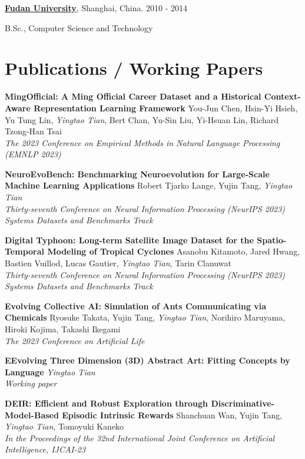 \documentclass[line,margin]{cv}
\newenvironment{block}
{
	\begin{addmargin}[2em]{0em}%
}
{
	\end{addmargin}
}
\newcommand{\Fudan}{\href{http://www.fudan.edu.cn/englishnew/}{Fudan University}}
\begin{document}
\begin{resume}
	{\bf \Fudan}, Shanghai, China. \hfill 2010 - 2014

	\begin{block}
		B.Sc., Computer Science and Technology 
	\end{block}



\section{Publications / Working Papers}

  {\bf MingOfficial: A Ming Official Career Dataset and a Historical Context-Aware Representation Learning Framework}
  You-Jun Chen, Hsin-Yi Hsieh, Yu Tung Lin, \emph{Yingtao Tian}, Bert Chan, Yu-Sin Liu, Yi-Hsuan Lin, Richard Tzong-Han Tsai\\
  \emph{The 2023 Conference on Empirical Methods in Natural Language Processing (EMNLP 2023)}

  {\bf NeuroEvoBench: Benchmarking Neuroevolution for Large-Scale Machine Learning Applications}
  Robert Tjarko Lange, Yujin Tang, \emph{Yingtao Tian}\\
  \emph{Thirty-seventh Conference on Neural Information Processing (NeurIPS 2023) Systems Datasets and Benchmarks Track}

  {\bf Digital Typhoon: Long-term Satellite Image Dataset for the Spatio-Temporal Modeling of Tropical Cyclones}
  Asanobu Kitamoto, Jared Hwang, Bastien Vuillod, Lucas Gautier, \emph{Yingtao Tian}, Tarin Clanuwat\\
  \emph{Thirty-seventh Conference on Neural Information Processing (NeurIPS 2023) Systems Datasets and Benchmarks Track}

  {\bf Evolving Collective AI: Simulation of Ants Communicating via Chemicals}
  Ryosuke Takata, Yujin Tang, \emph{Yingtao Tian}, Norihiro Maruyama, Hiroki Kojima, Takashi Ikegami\\
  \emph{The 2023 Conference on Artificial Life}

  {\bf EEvolving Three Dimension (3D) Abstract Art: Fitting Concepts by Language}
  \emph{Yingtao Tian}\\
  \emph{Working paper}

  {\bf DEIR: Efficient and Robust Exploration through Discriminative-Model-Based Episodic Intrinsic Rewards}
  Shanchuan Wan, Yujin Tang, \emph{Yingtao Tian}, Tomoyuki Kaneko\\
  \emph{In the Proceedings of the 32nd International Joint Conference on Artificial Intelligence, IJCAI-23}


\end{resume}
\end{document}
